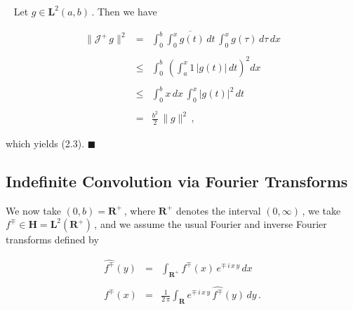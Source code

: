 \documentclass[11pt]{article}
\newenvironment{Proof}
{\bigskip\noindent{\bf Proof.}~\rm}{\bigskip}
\begin{document}
  \begin{Proof} Let $g \in {\mathbf L}^2(a,b)$\,.  Then we have

    \begin{equation}%
\begin{array}{rcl}
\|{\mathcal J}^+\,g\|^2 & = & \displaystyle \int_0^b
  \overline{\int_0^x g(t)\,dt} \, \int_0^x g(\tau) \,
  d\tau \,  dx \\
 && \\
& \leq & \displaystyle \int_0^b \, \left(\int_a^x 1\,|g(t)|\,dt\right)^2 dx
  \\ 
&& \\
& \leq &  \displaystyle \int_0^b x \, dx \, \int_0^x|g(t)|^2\,dt \\ 
&& \\ 
& = & \displaystyle \frac{b^2}{2}\,\|g\|^2\,,
\end{array}
\label{equation:2.4}
    \end{equation}

\noindent which yields (2.3).
\end{Proof} $\blacksquare$

 \subsection{Indefinite Convolution via Fourier Transforms} %
 
 \vspace{.2in} \noindent We now take $(0,b) = {\mathbf R}^+$\,, where
 ${\mathbf R}^+$ denotes the interval $(0,\infty)$\,, we take $f^\mp
 \in {\mathbf H} = {\mathbf L}^2({\mathbf R}^+)$\,, and we assume the
 usual Fourier and inverse Fourier transforms defined by 

 \begin{equation}%
   \begin{array}{rcl}
     \widehat{f^\mp}(y) & = & \displaystyle \int_{{\mathbf R}^+} f^\mp(x) \,
     e^{\mp\,i\,x\,y} \, dx \\
     && \\
 f^\mp(x) & = & \displaystyle \frac{1}{2\,\pi} \int_{\mathbf R}
 e^{\mp\,i\,x\,y} \, \widehat{f^\mp}(y) \, dy\,.
   \end{array}
   \label{equation:2.5}
 \end{equation}
\end{document}
